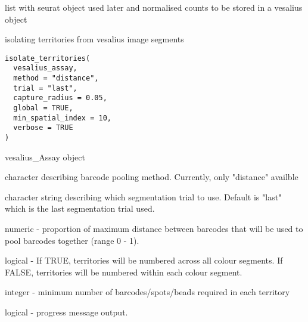 \documentclass[a4paper]{book}
\begin{document}
%
\begin{Value}
list with seurat object used later and normalised counts to be stored
in a vesalius object
\end{Value}
%
\begin{Description}
isolating territories from vesalius image segments
\end{Description}
%
\begin{Usage}
\begin{verbatim}
isolate_territories(
  vesalius_assay,
  method = "distance",
  trial = "last",
  capture_radius = 0.05,
  global = TRUE,
  min_spatial_index = 10,
  verbose = TRUE
)
\end{verbatim}
\end{Usage}
%
\begin{Arguments}
\begin{ldescription}
\item[\code{vesalius\_assay}] vesalius\_Assay object

\item[\code{method}] character describing barcode pooling method.
Currently, only "distance" availble

\item[\code{trial}] character string describing which segmentation trial
to use. Default is "last" which is the last segmentation trial used.

\item[\code{capture\_radius}] numeric - proportion of maximum distance between
barcodes that will be used to pool barcodes together (range 0 - 1).

\item[\code{global}] logical - If TRUE, territories will be numbered across all
colour segments. If FALSE, territories will be numbered within each colour
segment.

\item[\code{min\_spatial\_index}] integer - minimum number of barcodes/spots/beads
required in each territory

\item[\code{verbose}] logical - progress message output.
\end{ldescription}
\end{Arguments}
%
\end{document}
